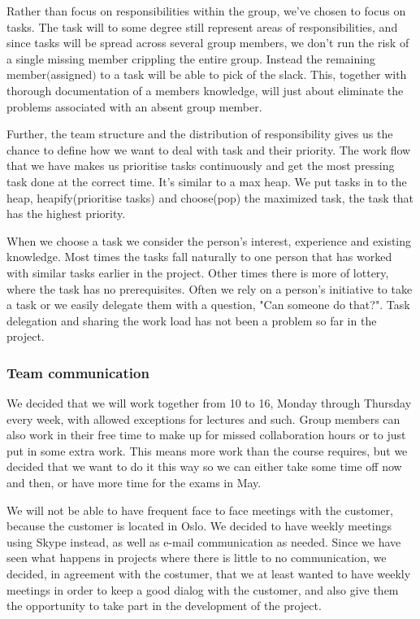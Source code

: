    Rather than focus on responsibilities within the group, we've chosen to focus on tasks.
The task will to some degree still represent areas of responsibilities, and since tasks will be spread across several group members, we don't run the risk of  a single missing member crippling the entire group. Instead the remaining member$($assigned$)$ to a task will be able to pick of the slack. This, together with thorough documentation of a members knowledge, will just about eliminate the problems associated with an absent group member.
        
    Further, the team structure and the distribution of responsibility gives us the chance to define how we want to deal with task and their priority. The work flow that we have makes us prioritise tasks continuously and get the most pressing task done at the correct time. It's similar to a max heap. We put tasks in to the heap, heapify(prioritise tasks) and choose(pop) the maximized task, the task that has the highest priority. 
    
    When we choose a task we consider the person's interest, experience and existing knowledge. Most times the tasks fall naturally to one person that has worked with similar tasks earlier in the project. Other times there is more of lottery, where the task has no prerequisites. Often we rely on a person's initiative to take a task or we easily delegate them with a question, "Can someone do that?". Task delegation and sharing the work load has not been a problem so far in the project.
    
    
    \subsubsection{Team communication}\label{Team communication}
    We decided that we will work together from 10 to 16, Monday through Thursday every week, with allowed exceptions for lectures and such. Group members can also work in their free time to make up for missed collaboration hours or to just put in some extra work. This means more work than the course requires, but we decided that we want to do it this way so we can either take some time off now and then, or have more time for the exams in May.

    We will not be able to have frequent face to face meetings with the customer, because the customer is located in Oslo. We decided to have weekly meetings using Skype instead, as well as e-mail communication as needed. Since we have seen what happens in projects where there is little to no communication, we decided, in agreement with the costumer, that we at least wanted to have weekly meetings in order to keep a good dialog with the customer, and also give them the opportunity to take part in the development of the project. 
    
